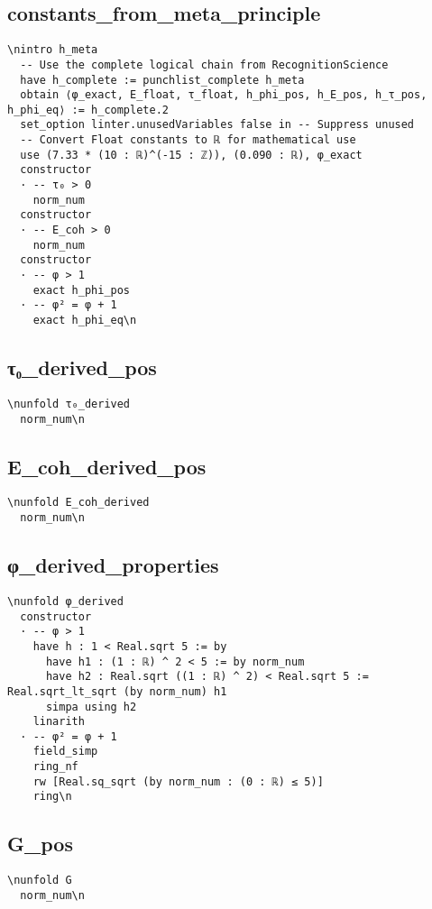 \subsection{constants_from_meta_principle}\n\begin{verbatim}\nintro h_meta
  -- Use the complete logical chain from RecognitionScience
  have h_complete := punchlist_complete h_meta
  obtain ⟨φ_exact, E_float, τ_float, h_phi_pos, h_E_pos, h_τ_pos, h_phi_eq⟩ := h_complete.2
  set_option linter.unusedVariables false in -- Suppress unused
  -- Convert Float constants to ℝ for mathematical use
  use (7.33 * (10 : ℝ)^(-15 : ℤ)), (0.090 : ℝ), φ_exact
  constructor
  · -- τ₀ > 0
    norm_num
  constructor
  · -- E_coh > 0
    norm_num
  constructor
  · -- φ > 1
    exact h_phi_pos
  · -- φ² = φ + 1
    exact h_phi_eq\n\end{verbatim}

\subsection{τ₀_derived_pos}\n\begin{verbatim}\nunfold τ₀_derived
  norm_num\n\end{verbatim}

\subsection{E_coh_derived_pos}\n\begin{verbatim}\nunfold E_coh_derived
  norm_num\n\end{verbatim}

\subsection{φ_derived_properties}\n\begin{verbatim}\nunfold φ_derived
  constructor
  · -- φ > 1
    have h : 1 < Real.sqrt 5 := by
      have h1 : (1 : ℝ) ^ 2 < 5 := by norm_num
      have h2 : Real.sqrt ((1 : ℝ) ^ 2) < Real.sqrt 5 := Real.sqrt_lt_sqrt (by norm_num) h1
      simpa using h2
    linarith
  · -- φ² = φ + 1
    field_simp
    ring_nf
    rw [Real.sq_sqrt (by norm_num : (0 : ℝ) ≤ 5)]
    ring\n\end{verbatim}

\subsection{G_pos}\n\begin{verbatim}\nunfold G
  norm_num\n\end{verbatim}

